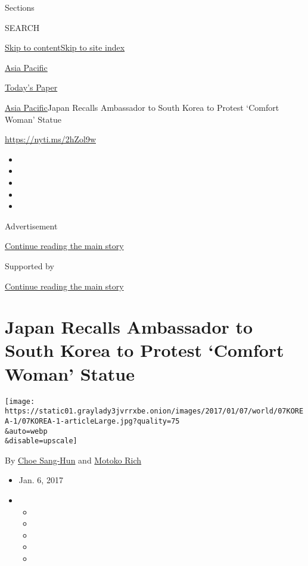 Sections

SEARCH

\protect\hyperlink{site-content}{Skip to
content}\protect\hyperlink{site-index}{Skip to site index}

\href{https://www.nytimes3xbfgragh.onion/section/world/asia}{Asia
Pacific}

\href{https://myaccount.nytimes3xbfgragh.onion/auth/login?response_type=cookie\&client_id=vi}{}

\href{https://www.nytimes3xbfgragh.onion/section/todayspaper}{Today's
Paper}

\href{/section/world/asia}{Asia Pacific}\textbar{}Japan Recalls
Ambassador to South Korea to Protest `Comfort Woman' Statue

\url{https://nyti.ms/2hZol9w}

\begin{itemize}
\item
\item
\item
\item
\item
\end{itemize}

Advertisement

\protect\hyperlink{after-top}{Continue reading the main story}

Supported by

\protect\hyperlink{after-sponsor}{Continue reading the main story}

\hypertarget{japan-recalls-ambassador-to-south-korea-to-protest-comfort-woman-statue}{%
\section{Japan Recalls Ambassador to South Korea to Protest `Comfort
Woman'
Statue}\label{japan-recalls-ambassador-to-south-korea-to-protest-comfort-woman-statue}}

\texttt{[image: https://static01.graylady3jvrrxbe.onion/images/2017/01/07/world/07KOREA-1/07KOREA-1-articleLarge.jpg?quality=75\\\&auto=webp\\\&disable=upscale]}

By \href{http://www.nytimes3xbfgragh.onion/by/choe-sang-hun}{Choe
Sang-Hun} and
\href{http://www.nytimes3xbfgragh.onion/by/motoko-rich}{Motoko Rich}

\begin{itemize}
\item
  Jan. 6, 2017
\item
  \begin{itemize}
  \item
  \item
  \item
  \item
  \item
  \end{itemize}
\end{itemize}

